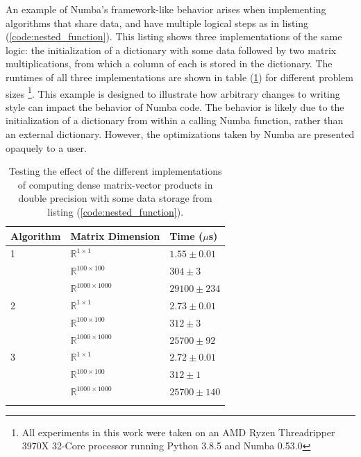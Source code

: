 \documentclass{IEEEcsmag}
\begin{document}
An example of Numba's framework-like behavior arises when implementing algorithms that share data, and have multiple logical steps as in listing (\ref{code:nested_function}). This listing shows three implementations of the same logic: the initialization of a dictionary with some data followed by two matrix multiplications, from which a column of each is stored in the dictionary. The runtimes of all three implementations are shown in table (\ref{tab:boxing_inlining}) for different problem sizes \footnote{All experiments in this work were taken on an AMD Ryzen Threadripper 3970X 32-Core processor running Python 3.8.5 and Numba 0.53.0}. This example is designed to illustrate how arbitrary changes to writing style can impact the behavior of Numba code. The behavior is likely due to the initialization of a dictionary from within a calling Numba function, rather than an external dictionary. However, the optimizations taken by Numba are presented opaquely to a user.

\begin{table}
    \caption{ Testing the effect of the different implementations of computing dense matrix-vector products in double precision with some data storage from listing (\ref{code:nested_function}). }
    \label{table}
    \small
    \begin{tabular*}{17.5pc}{@{}p{40pt}p{50pt}<{\raggedright}p{50pt}<{\raggedright}@{}}
    \\
    Algorithm & Matrix Dimension & Time ($\mu$s) \\
    \hline
     1 & $\mathbb{R}^{1 \times 1}$ &       $1.55  \pm 0.01$     \\
      & $\mathbb{R}^{100 \times 100}$ &   $304  \pm 3$  \\
      & $\mathbb{R}^{1000 \times 1000}$ & $29100 \pm 234$  \\
    \hline
     2 & $\mathbb{R}^{1 \times 1}$ &       $2.73  \pm 0.01$     \\
      & $\mathbb{R}^{100 \times 100}$ &   $312   \pm 3$ \\
      & $\mathbb{R}^{1000 \times 1000}$ & $25700 \pm 92$\\
    \hline
     3 & $\mathbb{R}^{1 \times 1}$ &        $2.72  \pm 0.01$ \\
      & $\mathbb{R}^{100 \times 100}$ &    $312  \pm 1$ \\
      & $\mathbb{R}^{1000 \times 1000}$ &  $25700  \pm 140$  \\
      \\
    
    \end{tabular*}
    \label{tab:boxing_inlining}
\end{table}
\end{document}
